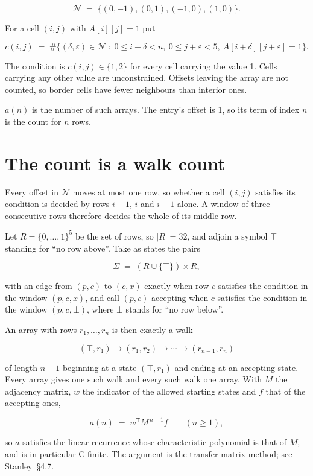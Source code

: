 \documentclass[11pt]{article}
\theoremstyle{definition}
\begin{document}
\[\mathcal{N} \;=\; \{(0,-1), (0,1), (-1,0), (1,0)\}.\]

For a cell $(i,j)$ with $A[i][j] = 1$ put

\[c(i,j) \;=\; \#\bigl\{(\delta,\varepsilon)\in\mathcal{N} \;:\; 0\le i+\delta<n,\ 0\le j+\varepsilon<5,\ A[i+\delta][j+\varepsilon] = 1\bigr\}.\]

The condition is $c(i,j) \in \{1, 2\}$ for every cell carrying the value 1. Cells carrying any other value are unconstrained. Offsets leaving the array are not counted, so border cells have fewer neighbours than interior ones.

$a(n)$ is the number of such arrays. The entry's offset is 1, so its term of index $n$ is the count for $n$ rows.

\section{The count is a walk count}

Every offset in $\mathcal{N}$ moves at most one row, so whether a cell $(i,j)$ satisfies its condition is decided by rows $i-1$, $i$ and $i+1$ alone. A window of three consecutive rows therefore decides the whole of its middle row.

Let $R = \{0,\dots,1\}^{5}$ be the set of rows, so $|R| = 32$, and adjoin a symbol $\top$ standing for ``no row above''. Take as states the pairs

\[\Sigma \;=\; (R \cup \{\top\}) \times R,\]

with an edge from $(p,c)$ to $(c,x)$ exactly when row $c$ satisfies the condition in the window $(p,c,x)$, and call $(p,c)$ accepting when $c$ satisfies the condition in the window $(p,c,\bot)$, where $\bot$ stands for ``no row below''.

An array with rows $r_1,\dots,r_n$ is then exactly a walk

\[(\top,r_1) \to (r_1,r_2) \to \cdots \to (r_{n-1},r_n)\]

of length $n-1$ beginning at a state $(\top,r_1)$ and ending at an accepting state. Every array gives one such walk and every such walk one array. With $M$ the adjacency matrix, $w$ the indicator of the allowed starting states and $f$ that of the accepting ones,

\[a(n) \;=\; w^{\mathsf T} M^{\,n-1} f \qquad (n \ge 1),\]

so $a$ satisfies the linear recurrence whose characteristic polynomial is that of $M$, and is in particular C-finite. The argument is the transfer-matrix method; see Stanley~\S4.7.
\end{document}
